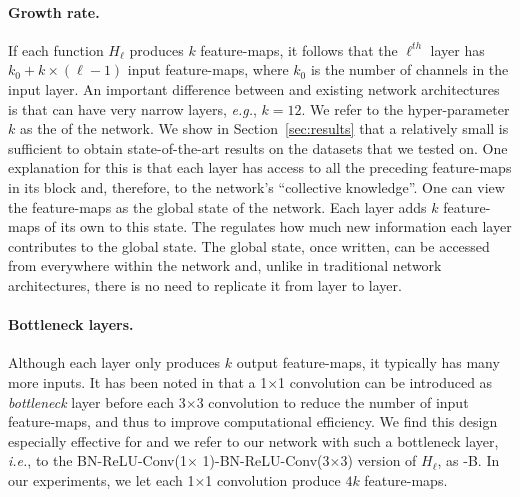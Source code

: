 
\vspace{-2 ex}
\paragraph{Growth rate.}
If each function $H_\ell$ produces $k$ feature-maps, it follows that the $\ell^{th}$ layer has $k_0+k\times (\ell-1)$ input feature-maps, where $k_0$ is the number of channels in the input layer. An important difference between \methodnameshort{} and existing network architectures is that \methodnameshort{} can have very narrow layers, \emph{e.g.}, $k=12$. We refer to the hyper-parameter $k$ as the \emph{\stepsizename{}} of the network. We show in Section~\ref{sec:results} that a relatively small \stepsizename{} is sufficient to obtain state-of-the-art results on the datasets that we tested on. One explanation for this is that each layer has access to all the preceding feature-maps in its block and, therefore, to the network's ``collective knowledge''. One can view the feature-maps as the global state of the network. Each layer adds $k$ feature-maps of its own to this state. The  \stepsizename{} regulates how much new information each layer contributes to the global state.
The global state, once written, can be accessed from everywhere within the network and, unlike in traditional network architectures, there is no need to replicate it from layer to layer.



\vspace{-2 ex}
\paragraph{Bottleneck layers.}
Although each layer only produces $k$ output feature-maps, it typically has many more inputs. It has been noted in \cite{szegedy2015rethinking,resnet} that a 1$\times$1 convolution can be introduced as \emph{bottleneck} layer before each 3$\times$3 convolution to reduce the number of input feature-maps, and thus to improve computational efficiency. We find this design especially effective for \methodnameshort{} and we refer to our network with such a bottleneck layer, \emph{i.e.}, to the BN-ReLU-Conv(1$\times$ 1)-BN-ReLU-Conv(3$\times$3) version of $H_\ell$, as \methodnameshort{}-B. In our experiments, we let each 1$\times$1 convolution produce $4k$ feature-maps.


